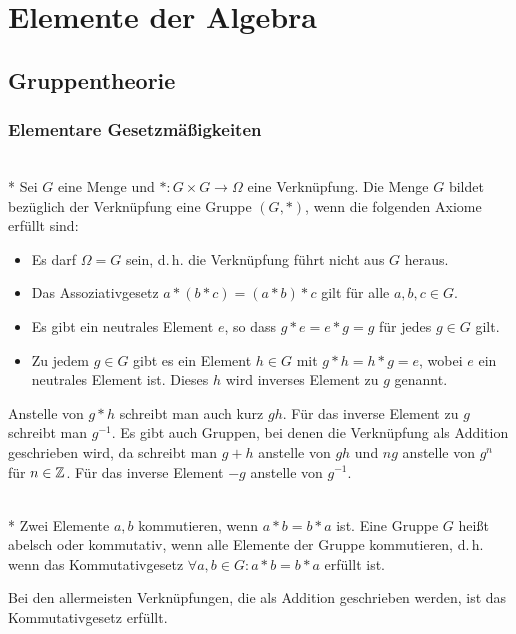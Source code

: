 
\chapter{Elemente der Algebra}

\section{Gruppentheorie}

\subsection{Elementare Gesetzmäßigkeiten}
\begin{Definition}[Gruppe]\mbox{}\\*
Sei $G$ eine Menge und $*\colon G\times G\to\Omega$ eine Verknüpfung.
Die Menge $G$ bildet bezüglich der Verknüpfung eine Gruppe $(G,*)$,
wenn die folgenden Axiome erfüllt sind:
\begin{itemize}
\item[\strong{(E)}]
Es darf $\Omega=G$ sein, d.\,h. die Verknüpfung führt nicht aus $G$ heraus.
\item[\strong{(A)}]
Das Assoziativgesetz $a*(b*c)=(a*b)*c$ gilt für alle $a,b,c\in G$.
\item[\strong{(N)}]
Es gibt ein neutrales Element $e$, so dass $g*e=e*g=g$ für jedes
$g\in G$ gilt.
\item[\strong{(I)}]
Zu jedem $g\in G$ gibt es ein Element $h\in G$ mit $g*h=h*g=e$,
wobei $e$ ein neutrales Element ist. Dieses $h$ wird
inverses Element zu $g$ genannt.
\end{itemize}
\end{Definition}
Anstelle von $g*h$ schreibt man auch kurz $gh$. Für das inverse Element
zu $g$ schreibt man $g^{-1}$. Es gibt auch Gruppen,
bei denen die Verknüpfung als Addition geschrieben wird, da schreibt
man $g+h$ anstelle von $gh$ und $ng$ anstelle von $g^n$ für $n\in\mathbb Z$.
Für das inverse Element $-g$ anstelle von $g^{-1}$.

\begin{Definition}\mbox{}\\*
Zwei Elemente $a,b$ kommutieren, wenn $a*b=b*a$ ist.
Eine Gruppe $G$ heißt abelsch oder kommutativ, wenn alle
Elemente der Gruppe kommutieren, d.\,h. wenn
das Kommutativgesetz $\forall a,b\in G\colon a*b=b*a$ erfüllt ist.
\end{Definition}
Bei den allermeisten Verknüpfungen, die als Addition 
geschrieben werden, ist das Kommutativgesetz erfüllt.


